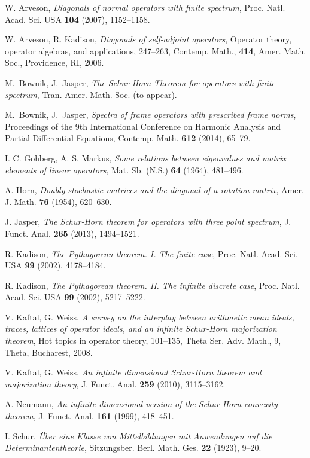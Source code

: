 \documentclass[12pt]{amsart}
\newcounter{Theorem}
\numberwithin{equation}{section}
\numberwithin{Theorem}{section}
\theoremstyle{plain}
\theoremstyle{definition}
\theoremstyle{remark}
\begin{document}
\begin{thebibliography}{99}

W. Arveson, 
{\it Diagonals of normal operators with finite spectrum},
Proc. Natl. Acad. Sci. USA {\bf 104} (2007), 1152--1158.

W. Arveson, R. Kadison, 
{\it Diagonals of self-adjoint operators}, Operator theory, operator algebras, and applications, 247--263, Contemp. Math., {\bf 414}, Amer. Math. Soc., Providence, RI, 2006.

M.~Bownik, J.~Jasper,
{\it 
The Schur-Horn Theorem for operators with finite spectrum},
Tran. Amer. Math. Soc. (to appear).

M.~Bownik, J.~Jasper,
{\it Spectra of frame operators with prescribed frame norms},
Proceedings of the 9th International Conference on  Harmonic Analysis and Partial Differential Equations, Contemp. Math. {\bf 612} (2014), 65--79.

I. C. Gohberg, A. S. Markus, 
{\it Some relations between eigenvalues and matrix elements of linear operators},  Mat. Sb. (N.S.) {\bf 64} (1964), 481--496.

A. Horn,
{\it  Doubly stochastic matrices and the diagonal of a rotation matrix},
Amer. J. Math. {\bf 76} (1954), 620--630.

J. Jasper,
{\it The Schur-Horn theorem for operators with three point spectrum},
J. Funct. Anal. {\bf 265} (2013), 1494--1521.

R. Kadison, 
{\it The Pythagorean theorem. I. The finite case},
Proc. Natl. Acad. Sci. USA {\bf 99} (2002), 4178--4184.

R. Kadison, 
{\it The Pythagorean theorem. II. The infinite discrete case},
Proc. Natl. Acad. Sci. USA {\bf 99} (2002), 5217--5222.

V. Kaftal, G. Weiss,
{\it A survey on the interplay between arithmetic mean ideals, traces, lattices of operator ideals, and an infinite Schur-Horn majorization theorem}, Hot topics in operator theory, 101--135, Theta Ser. Adv. Math., 9, Theta, Bucharest, 2008.

V. Kaftal, G. Weiss,
{\it An infinite dimensional Schur-Horn theorem and majorization theory},  J. Funct. Anal. {\bf 259} (2010), 3115--3162.

A. Neumann, 
{\it An infinite-dimensional version of the Schur-Horn convexity theorem},
J. Funct. Anal. {\bf 161} (1999), 418--451.

I. Schur,
{\it \"Uber eine Klasse von Mittelbildungen mit Anwendungen auf die Determinantentheorie}, 
Sitzungsber. Berl. Math. Ges. {\bf 22} (1923), 9--20.

\end{thebibliography}
\end{document}
